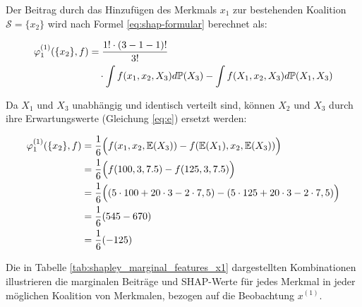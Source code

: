 Der Beitrag durch das Hinzufügen des Merkmals $x_1$ zur bestehenden Koalition $\mathcal{S} = \{x_2\}$ wird
nach Formel \ref{eq:shap-formular} berechnet als:

\begin{align}
    \varphi^{(1)}_{1}(\{x_2\}, f) &= \frac{1! \cdot (3 - 1 - 1)!}{3!} \\ \notag
        &\quad \cdot \int f(x_1, x_2 , X_3) d\mathbb{P}(X_3) - \int f(X_1, x_2, X_3) d\mathbb{P}(X_1, X_3)
\end{align}

Da \( X_1 \) und \( X_3 \) unabhängig und identisch verteilt sind, können \( X_2 \) und \( X_3 \) durch ihre Erwartungswerte (Gleichung \ref{eq:e}) ersetzt werden:

\begin{align}
    \varphi^{(1)}_{1}(\{x_2\}, f) &= \frac{1}{6} \Big(f(x_1, x_2, \mathbb{E}(X_3)) - f(\mathbb{E}(X_1), x_2, \mathbb{E}(X_3))\Big) \\ \notag
        &= \frac{1}{6} \Big( f(100, 3, 7.5) - f(125, 3, 7.5) \Big) \\ \notag
        &= \frac{1}{6} \Big( (5 \cdot 100 + 20 \cdot 3 - 2 \cdot 7,5) - (5 \cdot 125 + 20 \cdot 3 - 2 \cdot 7,5) \Big) \\ \notag
        &= \frac{1}{6} (545 - 670) \\ \notag
        &= \frac{1}{6} (-125)
\end{align}
 
Die in Tabelle \ref{tab:shapley_marginal_features_x1} dargestellten Kombinationen illustrieren die marginalen Beiträge und SHAP-Werte 
für jedes Merkmal in jeder möglichen Koalition von Merkmalen, bezogen auf die Beobachtung $x^{(1)}$. 

